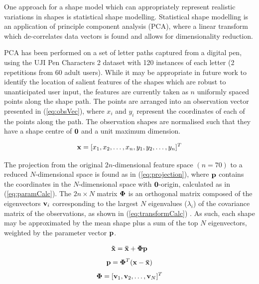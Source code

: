 \documentclass{sig-alternate}
\begin{document}
One approach for a shape model which can appropriately represent realistic
variations in shapes is statistical shape
modelling. Statistical shape modelling is an application of principle component
analysis (PCA), where a linear transform which de-correlates data vectors is
found \cite{Stegmann2002} and allows for dimensionality reduction. 

PCA has been performed on a set of letter paths captured from a digital pen,
using the UJI Pen Characters 2 dataset \cite{Llorens2008} with 120 instances of
each letter (2 repetitions from 60 adult users). While it may be appropriate in future work to
identify the location of salient features of the shapes which are robust to unanticipated user input,
the features are currently taken as $n$ uniformly spaced points along the shape
path. The
points are arranged into an observation vector presented in (\ref{eq:obsVec}),
where $x_i$ and $y_i$ represent the coordinates of each of the points along the
path. The observation shapes are normalised such that they have a shape
centre of ${\bf 0}$ and a unit maximum dimension.

\begin{equation}\label{eq:obsVec}
{\bf x} = [x_1, x_2, \ldots, x_n, y_1, y_2, \ldots, y_n]^T
\end{equation}


The projection from the original $2n$-dimensional feature space $(n=70)$ to a reduced
$N$-dimensional space is found as in (\ref{eq:projection}), where ${\bf p}$
contains the coordinates in the $N$-dimensional space with ${\bf 0}$-origin,
calculated as in (\ref{eq:paramCalc}). The $2n\times N$ matrix ${\bf \Phi }$ is
an orthogonal matrix composed of the eigenvectors ${\bf v}_i$ corresponding to
the largest $N$ eigenvalues ($\lambda_i$) of the covariance matrix of the
observations, as shown in (\ref{eq:transformCalc}) \cite{Stegmann2002}. As such,
each shape may be approximated by the mean shape plus a sum of the top $N$
eigenvectors, weighted by the parameter vector ${\bf p}$. 

\begin{equation}\label{eq:projection}
{\bf \tilde{x}=\bar{x}+\Phi p}
\end{equation}
\begin{equation}\label{eq:paramCalc}
{\bf p} ={\bf \Phi}^T ({\bf {x}-\bar{x}})
\end{equation}
\begin{equation}\label{eq:transformCalc}
{\bf \Phi} = [{\bf v}_1, {\bf v}_2, \ldots, {\bf v}_N]^T
\end{equation}
\end{document}
